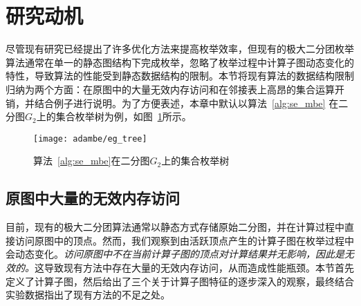 \section{研究动机}

尽管现有研究已经提出了许多优化方法来提高枚举效率，但现有的极大二分团枚举算法通常在单一的静态图结构下完成枚举，忽略了枚举过程中计算子图动态变化的特性，导致算法的性能受到静态数据结构的限制。本节将现有算法的数据结构限制归纳为两个方面：在原图中的大量无效内存访问和在邻接表上高昂的集合运算开销，并结合例子进行说明。为了方便表述，本章中默认以算法~\ref{alg:se_mbe} 在二分图$G_2$上的集合枚举树为例，如图~\ref{fig:ada_tree}所示。



\begin{figure} [t]
	\centering
  \vspace{0.1in}
	\texttt{[image: adambe/eg\_tree]}
  \vspace{0.2in}
	\caption{算法~\ref{alg:se_mbe}在二分图$G_2$上的集合枚举树}

	\label{fig:ada_tree}
\end{figure}

\subsection{原图中大量的无效内存访问}
\label{subsec:ada_limitation_vertex}

目前，现有的极大二分团算法通常以静态方式存储原始二分图，并在计算过程中直接访问原图中的顶点。然而，我们观察到由活跃顶点产生的计算子图在枚举过程中会动态变化。\emph{访问原图中不在当前计算子图的顶点对计算结果并无影响，因此是无效的。}这导致现有方法中存在大量的无效内存访问，从而造成性能瓶颈。本节首先定义了计算子图，然后给出了三个关于计算子图特征的逐步深入的观察，最终结合实验数据指出了现有方法的不足之处。

